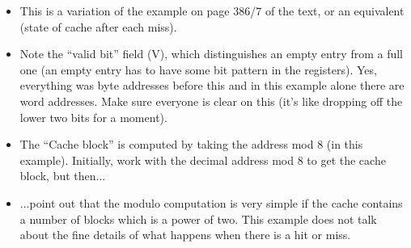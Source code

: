\begin{frame}[fragile]
\begin{itemize}
\item This is a variation of the example on page 386/7 of
	the text, or an equivalent (state of cache after each miss). 
\item Note the
``valid bit'' field (V), which distinguishes an empty entry from a full one
	(an empty entry has to have some bit pattern in the registers). Yes,
	everything was byte addresses before this and in this example alone
	there are word addresses. Make sure everyone is clear on this (it's
	like dropping off the lower two bits for a moment). 
\item The ``Cache block'' is computed by taking the address mod 8 (in this
	example).  Initially, work with the decimal address mod 8 to get
	the cache block, but then...
\item ...point out that the
	modulo computation is very simple if the cache contains a number of
	blocks which is a power of two. This example does not talk about the
	fine details of what happens when there is a hit or miss.
\end{itemize}
\fi\ENotes
\end{frame}

